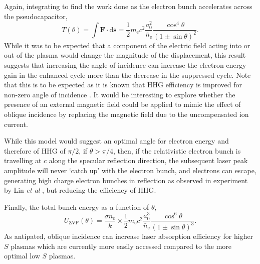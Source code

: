 Again, integrating to find the work done as the electron bunch accelerates across the pseudocapacitor,
\begin{equation}\label{eq:zvp_Tzvp_theta}
	T (\theta)=  \int \mathbf{F}\cdot\mathrm{d}\mathbf{s} = \frac{1}{2}m_\mathrm{e}c^2\frac{a^2_0}{\bar{n}_\mathrm{e}}\frac{\cos^4\theta}{(1\pm \sin\theta)^2}.
\end{equation}
While it was to be expected that a component of the electric field acting into or out of the plasma would change the magnitude of the displacement, this result suggests that increasing the angle of incidence can increase the electron energy gain in the enhanced cycle more than the decrease in the suppressed cycle. Note that this is to be expected as it is known that HHG efficiency is improved for non-zero angle of incidence \cite{gonoskovUltrarelativisticNanoplasmonicsRoute2011, edwardsXRayEmissionEffectiveness2020}. It would be interesting to explore whether the presence of an external magnetic field could be applied to mimic the effect of oblique incidence by replacing the magnetic field due to the uncompensated ion current.

While this model would suggest an optimal angle for electron energy and therefore of \ac{HHG} of $\pi/2$, if $\theta > \pi/4$, then, if the relativistic electron bunch is travelling at $c$ along the specular reflection direction, the subsequent laser peak amplitude will never `catch up' with the electron bunch, and electrons can escape, generating high charge electron bunches in reflection as observed in experiment by Lin \textit{et al }\cite{linIsolatedAttosecondElectron2020}, but reducing the efficiency of HHG.

Finally, the total bunch energy as a function of $\theta$,
\begin{equation}\label{eq:zvp_Uzvp_theta}
	U_\mathrm{ZVP}(\theta) = \frac{\sigma n_\mathrm{c}}{k}\times \frac{1}{2}m_\mathrm{e}c^2 \frac{a^3_0}{\bar{n}_\mathrm{e}}\frac{\cos^6\theta}{(1\pm \sin\theta)^3}.
\end{equation}
As antipated, oblique incidence can increase laser absorption efficiency for higher $S$ plasmas which are currently more easily accessed compared to the more optimal low $S$ plasmas.

